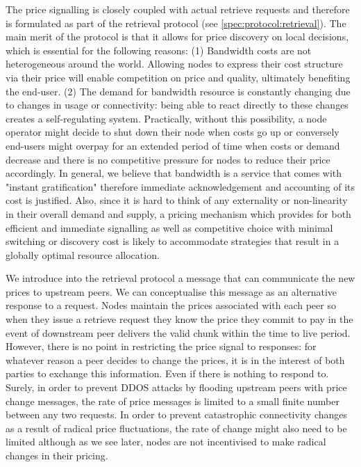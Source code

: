 The price signalling is closely coupled with actual retrieve requests and therefore is formulated as part of the retrieval protocol (see \ref{spec:protocol:retrieval}). The main merit of the protocol is that it allows for price discovery on local decisions, which is essential for the following reasons: (1) Bandwidth costs are not heterogeneous around the world. Allowing nodes to express their cost structure via their price will enable competition on price and quality, ultimately benefiting the end-user. (2) The demand for bandwidth resource is constantly changing due to changes in usage or connectivity: being able to react directly to these changes creates a self-regulating system. Practically, without this possibility, a node operator might decide to shut down their node when costs go up or conversely end-users might overpay for an extended period of time when costs or demand decrease and there is no competitive pressure for nodes to reduce their price accordingly. In general, we believe that bandwidth is a service that comes with "instant gratification" therefore immediate acknowledgement and accounting of its cost is justified. Also, since it is hard to think of any externality or non-linearity in their overall demand and supply, a pricing mechanism which provides for both efficient and immediate signalling as well as competitive choice with minimal switching or discovery cost is likely to accommodate strategies that result in a globally optimal resource allocation.

We introduce into the retrieval protocol a message that can communicate the new prices to upstream peers. We can conceptualise this message as an alternative response to a request. Nodes maintain the prices associated with each peer so when they issue a retrieve request they know the price they commit to pay in the event of downstream peer delivers the valid chunk within the time to live period. However, there is no point in restricting the price signal to responses: for whatever reason a peer decides to change the prices, it is in the interest of both parties to exchange this information. Even if there is nothing to respond to. Surely, in order to prevent DDOS attacks by flooding upstream peers with price change messages, the rate of price messages is limited to a small finite number between any two requests. In order to prevent catastrophic connectivity changes as a result of radical price fluctuations, the rate of change might also need to be limited although as we see later, nodes are not incentivised to make radical changes in their pricing.

